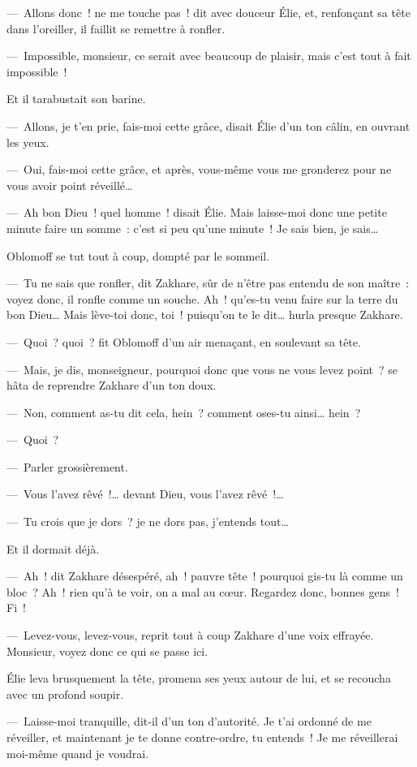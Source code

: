\documentclass[french,twoside]{book} %
\begin{document}
— Allons donc ! ne me touche pas ! dit avec douceur Élie, et, renfonçant sa tête dans l’oreiller, il faillit se remettre à ronfler.\par
— Impossible, monsieur, ce serait avec beaucoup de plaisir, mais c’est tout à fait impossible !\par
Et il tarabustait son barine.\par
— Allons, je t’en prie, fais-moi cette grâce, disait Élie d’un ton câlin, en ouvrant les yeux.\par
— Oui, fais-moi cette grâce, et après, vous-même vous me gronderez pour ne vous avoir point réveillé…\par
— Ah bon Dieu ! quel homme ! disait Élie. Mais laisse-moi donc une petite minute faire un somme : c’est si peu qu’une minute ! Je sais bien, je sais…\par
Oblomoff se tut tout à coup, dompté par le sommeil.\par
— Tu ne sais que ronfler, dit Zakhare, sûr de n’être pas entendu de son maître : voyez donc, il ronfle comme un souche. Ah ! qu’es-tu venu faire sur la terre du bon Dieu… Mais lève-toi donc, toi ! puisqu’on te le dit… hurla presque Zakhare.\par
— Quoi ? quoi ? fit Oblomoff d’un air menaçant, en soulevant sa tête.\par
— Mais, je dis, monseigneur, pourquoi donc que vous ne vous levez point ? se hâta de reprendre Zakhare d’un ton doux.\par
— Non, comment as-tu dit cela, hein ? comment oses-tu ainsi… hein ?\par
— Quoi ?\par
— Parler grossièrement.\par
— Vous l’avez rêvé !… devant Dieu, vous l’avez rêvé !…\par
— Tu crois que je dors ? je ne dors pas, j’entends tout…\par
Et il dormait déjà.\par
— Ah ! dit Zakhare désespéré, ah ! pauvre tête ! pourquoi gis-tu là comme un bloc ? Ah ! rien qu’à te voir, on a mal au cœur. Regardez donc, bonnes gens ! Fi !\par
— Levez-vous, levez-vous, reprit tout à coup Zakhare d’une voix effrayée. Monsieur, voyez donc ce qui se passe ici.\par
Élie leva brusquement la tête, promena ses yeux autour de lui, et se recoucha avec un profond soupir.\par
— Laisse-moi tranquille, dit-il d’un ton d’autorité. Je t’ai ordonné de me réveiller, et maintenant je te donne contre-ordre, tu entends ! Je me réveillerai moi-même quand je voudrai.\par
\end{document}
